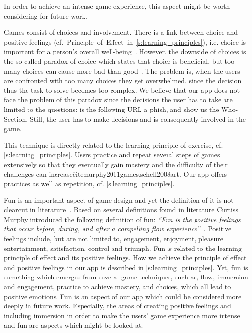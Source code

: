 \begin{description}[leftmargin=0cm]
In order to achieve an intense game experience, this aspect might be worth considering for future work.
	\item[Choice and Involvement]
Games consist of choices and involvement. 
There is a link between choice and positive feelings (cf.~Principle~of~Effect~in~\autoref{s:learning_principles}), i.e. choice is important for a person's overall well-being~\cite{seligman2012flourish, schwartz2009paradox}.
However, the downside of choices is the so called paradox of choice which states that choice is beneficial, but too many choices can cause more bad than good~\cite{schwartz2009paradox}.
The problem is, when the users are confronted with too many choices they get overwhelmed, since the decision thus the task to solve becomes too complex.
We believe that our app does not face the problem of this paradox since the decisions the user has to take are limited to the questions:
is the following URL a phish, and show us the Who-Section.
Still, the user has to make decisions and is consequently involved in the game.
	\item[Practice] This technique is directly related to the learning principle of exercise, cf. \autoref{s:learning_principles}. 
Users practice and repeat several steps of games extensively so that they eventually gain mastery and the difficulty of their challenges can increase\~cite{murphy2011games,schell2008art}. 
Our app offers practices as well as repetition, cf. \autoref{s:learning_principles}.
	\item[Fun] Fun is an important aspect of game design and yet the definition of it is not clearcut in literature~\cite{murphy2011games, schell2008art,koster2010theory}.
Based on several definitions found in literature Curtiss Murphy introduced the following definition of fun: \textit{``Fun is the positive feelings that occur before, during, and after a compelling flow experience''}~\cite{murphy2011games}.
Positive feelings include, but are not limited to, engagement, enjoyment, pleasure, entertainment, satisfaction, control and triumph. 
Fun is related to the learning principle of effect and its positive feelings.
How we achieve the principle of effect and positive feelings in our app is described in \autoref{s:learning_principles}.
Yet, fun is something which emerges from several game techniques, such as, flow, immersion and engagement, practice to achieve mastery, and choices, which all lead to positive emotions.
Fun is an aspect of our app which could be considered more deeply in future work. 
Especially, the areas of creating positive feelings and including immersion in order to make the users' game experience more intense and fun are aspects which might be looked at.
\end{description}